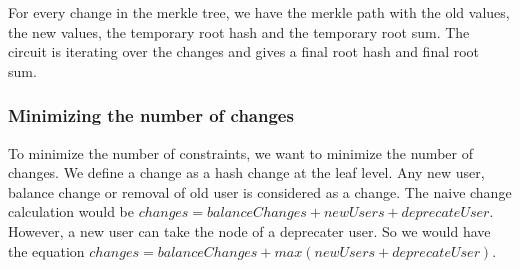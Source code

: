 For every change in the merkle tree, we have the merkle path with the old values, the new values, the temporary root hash and
the temporary root sum.
The circuit is iterating over the changes and gives a final root hash and final root sum.

\subsubsection{Minimizing the number of changes}
To minimize the number of constraints, we want to minimize the number of changes.
We define a change as a hash change at the leaf level. Any new user, balance change or removal of old user is considered as a change.
The naive change calculation would be $changes = balanceChanges + newUsers + deprecateUser$.
However, a new user can take the node of a deprecater user. So we would have the equation $changes = balanceChanges +max(newUsers + deprecateUser)$.

